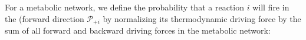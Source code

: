 For a metabolic network, we define the probability that a reaction $i$ will fire in the (forward direction ${\mathcal P_{+i}}$ by normalizing its thermodynamic driving force by the sum of all forward and backward driving forces in the metabolic network: